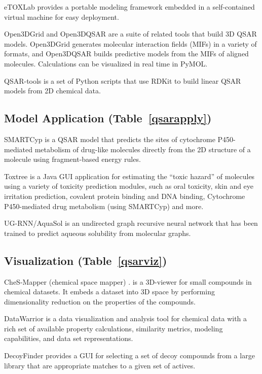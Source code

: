 eTOXLab \cite{Carri__2015} provides a portable modeling framework embedded in a self-contained virtual machine for easy deployment.

Open3DGrid and Open3DQSAR \cite{Tosco_2010} are a suite of related tools that build 3D QSAR models.  Open3DGrid generates molecular interaction fields (MIFs) in a variety of formats, and Open3DQSAR builds predictive models from the MIFs of aligned molecules.  Calculations can be visualized in real time in PyMOL.

QSAR-tools is a set of Python scripts that use RDKit to build linear QSAR models from 2D chemical data. 

\subsection*{Model Application (Table~\ref{qsarapply})}

SMARTCyp \cite{Rydberg_2010} is a QSAR model that predicts the sites of cytochrome P450-mediated metabolism of drug-like molecules directly from the 2D structure of a molecule using fragment-based energy rules.

Toxtree \cite{Patlewicz_2008} is a Java GUI application for estimating the ``toxic hazard'' of molecules using a variety of toxicity prediction modules, such as oral toxicity, skin  and eye irritation prediction, covalent protein binding and DNA binding, Cytochrome P450-mediated drug metabolism (using SMARTCyp) and more.

UG-RNN/AquaSol \cite{Lusci_2013} is an undirected graph recursive neural network that has been trained to predict aqueous solubility from molecular graphs. 

\subsection*{Visualization (Table~\ref{qsarviz})}
CheS-Mapper (chemical space mapper) \cite{G_tlein_2012,G_tlein_2014}. is a 3D-viewer for small compounds in chemical datasets. It embeds a dataset into 3D space by performing dimensionality reduction on the properties of the compounds.

DataWarrior \cite{Sander_2015} is a data visualization and analysis tool for chemical data with a rich set of available property calculations, similarity metrics, modeling capabilities, and data set representations.

DecoyFinder \cite{Cereto_Massague_2012} provides a GUI for selecting a set of decoy compounds from a large library that are appropriate matches to a given set of actives.

